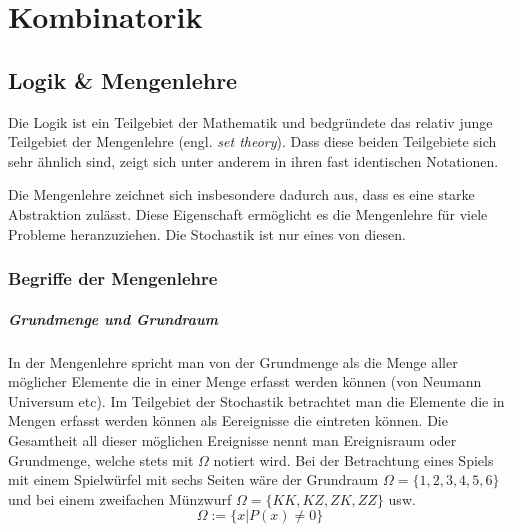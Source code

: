 



\chapter{Kombinatorik}
\newpage

\section{Logik \& Mengenlehre}
Die Logik ist ein Teilgebiet der Mathematik und bedgründete das relativ
junge Teilgebiet der \gls{Mengenlehre} (engl. \emph{set theory}). 
Dass diese beiden Teilgebiete sich sehr ähnlich sind, zeigt sich 
unter anderem in ihren fast identischen Notationen.

Die Mengenlehre zeichnet sich insbesondere dadurch aus, 
dass es eine starke \gls{Abstraktion} zulässt.
Diese Eigenschaft ermöglicht es die Mengenlehre für viele Probleme
heranzuziehen. Die Stochastik ist nur eines von diesen.

\subsection{Begriffe der Mengenlehre}
\paragraph{Grundmenge und Grundraum}
In der Mengenlehre spricht man von der Grundmenge als die Menge aller
möglicher Elemente die in einer Menge erfasst werden können (von Neumann
Universum etc). Im Teilgebiet der Stochastik betrachtet man die
Elemente die in Mengen erfasst werden können als Eereignisse die eintreten
können. Die Gesamtheit all dieser möglichen Ereignisse nennt man 
\gls{Ereignisraum} oder Grundmenge, welche stets mit $\Omega$ 
notiert wird. 
Bei der Betrachtung eines Spiels mit einem Spielwürfel mit sechs Seiten 
wäre der Grundraum $\Omega=\{1,2,3,4,5,6\}$ und bei einem zweifachen
Münzwurf $\Omega=\{KK, KZ, ZK, ZZ\}$ usw.
\[  
	\Omega := \{x| P(x) \neq 0\}
\]

